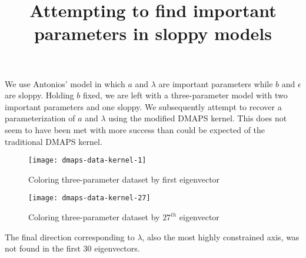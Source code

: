 \documentclass[11pt]{article}
\title{Attempting to find important parameters in sloppy models}
\begin{document}
\maketitle

We use Antonios' model in which $a$ and $\lambda$ are important parameters while $b$ and $\epsilon$ are sloppy. Holding $b$ fixed, we are left with a three-parameter model with two important parameters and one sloppy. We subsequently attempt to recover a parameterization of $a$ and $\lambda$ using the modified DMAPS kernel. This does not seem to have been met with more success than could be expected of the traditional DMAPS kernel.

\begin{figure}[htbp]
  \centering
  \texttt{[image: dmaps-data-kernel-1]}
  \caption{Coloring three-parameter dataset by first eigenvector}
\end{figure}

\begin{figure}[htbp]
  \centering
  \texttt{[image: dmaps-data-kernel-27]}
  \caption{Coloring three-parameter dataset by $27^{th}$ eigenvector}
\end{figure}

The final direction corresponding to $\lambda$, also the most highly constrained axis, was not found in the first 30 eigenvectors.

% 
% 
\end{document}
